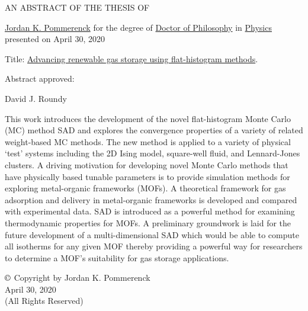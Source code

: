 \thispagestyle{empty}
\begin{center}
	\large
	AN ABSTRACT OF THE THESIS OF
\end{center}


\justify{}
\underline{Jordan K. Pommerenck} for the degree of \underline{Doctor of Philosophy} in \underline{Physics}
presented on April 30, 2020
\vspace{1.0cm}

\justify{}
Title: \underline{Advancing renewable gas storage using flat-histogram methods}.
\vspace{2.0cm}

\justify{}
Abstract approved:
\underline{\hspace{11cm}}
\vspace{0.5cm}

\hspace{7.0cm} David J. Roundy
\vspace{1.0cm}

\justify{}
\doublespacing
This work introduces the development of the novel flat-histogram Monte
Carlo (MC) method SAD and explores the convergence properties of a
variety of related weight-based MC methods. The new method is applied
to a variety of physical ‘test’ systems including the 2D Ising model,
square-well fluid, and Lennard-Jones clusters. A driving motivation for
developing novel Monte Carlo methods that have physically based tunable
parameters is to provide simulation methods for exploring metal-organic
frameworks (MOFs). A theoretical framework for gas adsorption and
delivery in metal-organic frameworks is developed and compared with
experimental data. SAD is introduced as a powerful method for examining
thermodynamic properties for MOFs. A preliminary groundwork is laid for
the future development of a multi-dimensional SAD which would be able
to compute all isotherms for any given MOF thereby providing a powerful
way for researchers to determine a MOF’s suitability for gas storage
applications.


\newpage{}
\thispagestyle{empty}
\singlespacing

\vspace*{4.0cm}
\begin{center}
$\copyright$ Copyright by Jordan K. Pommerenck \\
April 30, 2020 \\
(All Rights Reserved)
\end{center}

\newpage{}
\thispagestyle{empty}
\singlespacing

